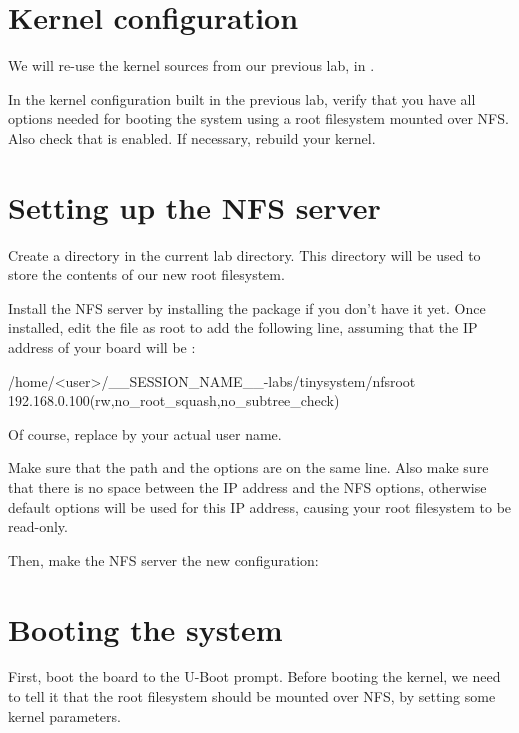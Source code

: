 \section{Kernel configuration}

We will re-use the kernel sources from our previous lab, in
.

In the kernel configuration built in the previous lab, verify that you
have all options needed for booting the system using a root filesystem
mounted over NFS. Also check that  is
enabled. If necessary, rebuild your kernel.

\section{Setting up the NFS server}

Create a  directory in the current lab directory. This
 directory will be used to store the contents of our new
root filesystem.

Install the NFS server by installing the 
package if you don't have it yet. Once installed, edit the
 file as root to add the following line, assuming that the
IP address of your board will be :

\begin{fileinput}
/home/<user>/__SESSION_NAME__-labs/tinysystem/nfsroot 192.168.0.100(rw,no_root_squash,no_subtree_check)
\end{fileinput}

Of course, replace  by your actual user name.

Make sure that the path and the options are on the same line.
Also make sure that there is no space between the IP address and the NFS
options, otherwise default options will be used for this IP address,
causing your root filesystem to be read-only.

Then, make the NFS server the new configuration:


\section{Booting the system}

First, boot the board to the U-Boot prompt. Before booting the kernel,
we need to tell it that the root filesystem should be mounted over
NFS, by setting some kernel parameters.

